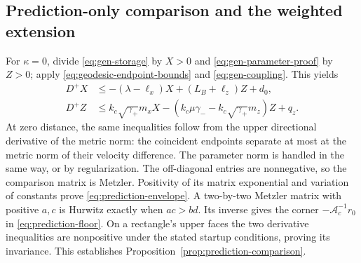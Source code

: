 \subsection{Prediction-only comparison and the weighted extension}
\label{app:prediction-proof}
For $\kappa=0$, divide \eqref{eq:gen-storage} by $X>0$ and
\eqref{eq:gen-parameter-proof} by $Z>0$; apply
\eqref{eq:geodesic-endpoint-bounds} and \eqref{eq:gen-coupling}. This yields
\begin{align}
 D^+X&\le-(\lambda-\ell_x)X+(L_B+\ell_z)Z+d_0,\nonumber\\
 D^+Z&\le k_c\sqrt{\gamma_+}m_xX
 -(k_c\mu\gamma_--k_c\sqrt{\gamma_+}m_z)Z+q_z.
 \label{eq:prediction-proof}
\end{align}
At zero distance, the same inequalities follow from the upper directional
derivative of the metric norm: the coincident endpoints separate at most
at the metric norm of their velocity difference. The parameter norm is
handled in the same way, or by regularization. The off-diagonal entries
are nonnegative, so the comparison matrix is Metzler. Positivity of its
matrix exponential and variation of constants prove
\eqref{eq:prediction-envelope}. A two-by-two Metzler matrix with positive
$a,c$ is Hurwitz exactly when $ac>bd$. Its inverse gives the corner
$-\mathcal A_c^{-1}r_0$ in \eqref{eq:prediction-floor}. On a rectangle's
upper faces the two derivative inequalities are nonpositive under the
stated startup conditions, proving its invariance. This establishes
Proposition~\ref{prop:prediction-comparison}.

